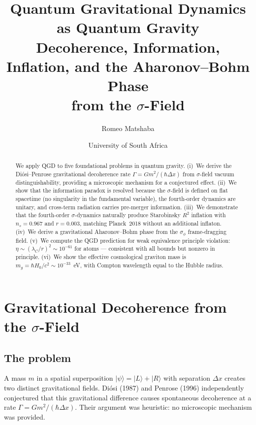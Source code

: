 \documentclass[11pt,a4paper]{article}
\title{\textbf{Quantum Gravitational Dynamics as Quantum Gravity}\\[4pt]
\Large Decoherence, Information, Inflation, and the Aharonov--Bohm Phase\\[4pt]
\normalsize from the $\sigma$-Field}
\author{Romeo Matshaba}
\date{University of South Africa}
\theoremstyle{plain}
\theoremstyle{definition}
\theoremstyle{remark}
\begin{document}
\maketitle

\begin{abstract}
We apply QGD to five foundational problems in quantum gravity.  (i)~We derive the Di\'osi--Penrose gravitational decoherence rate $\Gamma = Gm^2/(\hbar\Delta x)$ from $\sigma$-field vacuum distinguishability, providing a microscopic mechanism for a conjectured effect.  (ii)~We show that the information paradox is resolved because the $\sigma$-field is defined on flat spacetime (no singularity in the fundamental variable), the fourth-order dynamics are unitary, and cross-term radiation carries pre-merger information.  (iii)~We demonstrate that the fourth-order $\sigma$-dynamics naturally produce Starobinsky $R^2$ inflation with $n_s = 0.967$ and $r = 0.003$, matching Planck~2018 without an additional inflaton.  (iv)~We derive a gravitational Aharonov--Bohm phase from the $\sigma_\phi$ frame-dragging field.  (v)~We compute the QGD prediction for weak equivalence principle violation: $\eta \sim (\lambda_C/r)^2 \sim 10^{-61}$ for atoms --- consistent with all bounds but nonzero in principle.  (vi)~We show the effective cosmological graviton mass is $m_g = \hbar H_0/c^2 \sim 10^{-33}$~eV, with Compton wavelength equal to the Hubble radius.
\end{abstract}

\tableofcontents

\section{Gravitational Decoherence from the $\sigma$-Field}
\label{sec:decoherence}

\subsection{The problem}

A mass $m$ in a spatial superposition $|\psi\rangle = |L\rangle + |R\rangle$ with separation $\Delta x$ creates two distinct gravitational fields.  Di\'osi (1987) and Penrose (1996) independently conjectured that this gravitational difference causes spontaneous decoherence at a rate $\Gamma = Gm^2/(\hbar\Delta x)$.  Their argument was heuristic: no microscopic mechanism was provided.
\end{document}
